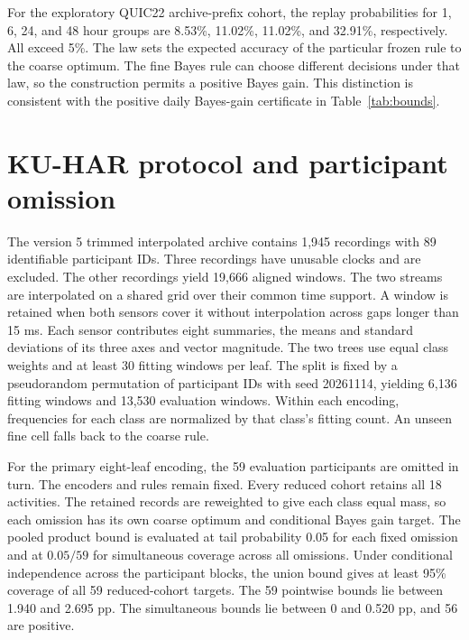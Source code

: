 \documentclass[preprint,11pt]{elsarticle}
\begin{document}
For the exploratory QUIC22 archive-prefix cohort, the replay probabilities for 1, 6, 24, and 48 hour groups are 8.53\%, 11.02\%, 11.02\%, and 32.91\%, respectively. All exceed 5\%. The law sets the expected accuracy of the particular frozen rule to the coarse optimum. The fine Bayes rule can choose different decisions under that law, so the construction permits a positive Bayes gain. This distinction is consistent with the positive daily Bayes-gain certificate in Table~\ref{tab:bounds}.

\section{KU-HAR protocol and participant omission}
\label{app:kuhar}

The version 5 trimmed interpolated archive contains 1,945 recordings with 89 identifiable participant IDs. Three recordings have unusable clocks and are excluded. The other recordings yield 19,666 aligned windows. The two streams are interpolated on a shared grid over their common time support. A window is retained when both sensors cover it without interpolation across gaps longer than 15 ms. Each sensor contributes eight summaries, the means and standard deviations of its three axes and vector magnitude. The two trees use equal class weights and at least 30 fitting windows per leaf. The split is fixed by a pseudorandom permutation of participant IDs with seed 20261114, yielding 6,136 fitting windows and 13,530 evaluation windows. Within each encoding, frequencies for each class are normalized by that class's fitting count. An unseen fine cell falls back to the coarse rule.

For the primary eight-leaf encoding, the 59 evaluation participants are omitted in turn. The encoders and rules remain fixed. Every reduced cohort retains all 18 activities. The retained records are reweighted to give each class equal mass, so each omission has its own coarse optimum and conditional Bayes gain target. The pooled product bound is evaluated at tail probability 0.05 for each fixed omission and at $0.05/59$ for simultaneous coverage across all omissions. Under conditional independence across the participant blocks, the union bound gives at least 95\% coverage of all 59 reduced-cohort targets. The 59 pointwise bounds lie between 1.940 and 2.695 pp. The simultaneous bounds lie between 0 and 0.520 pp, and 56 are positive.

\FloatBarrier
\setlength{\bibsep}{3pt plus 1pt}


\end{document}
